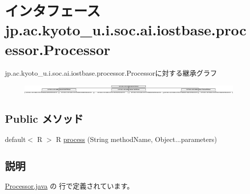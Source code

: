 \hypertarget{interfacejp_1_1ac_1_1kyoto__u_1_1i_1_1soc_1_1ai_1_1iostbase_1_1processor_1_1_processor}{\section{インタフェース jp.\-ac.\-kyoto\-\_\-u.\-i.\-soc.\-ai.\-iostbase.\-processor.\-Processor}
\label{interfacejp_1_1ac_1_1kyoto__u_1_1i_1_1soc_1_1ai_1_1iostbase_1_1processor_1_1_processor}
}
jp.\-ac.\-kyoto\-\_\-u.\-i.\-soc.\-ai.\-iostbase.\-processor.\-Processorに対する継承グラフ\begin{figure}[H]
\begin{center}
\leavevmode
\includegraphics[height=0.545809cm]{interfacejp_1_1ac_1_1kyoto__u_1_1i_1_1soc_1_1ai_1_1iostbase_1_1processor_1_1_processor}
\end{center}
\end{figure}
\subsection*{Public メソッド}
\begin{DoxyCompactItemize}
\item 
default$<$ R $>$ R \hyperlink{interfacejp_1_1ac_1_1kyoto__u_1_1i_1_1soc_1_1ai_1_1iostbase_1_1processor_1_1_processor_a66086dbe725d172267c517aa15f2122e}{process} (String method\-Name, Object...\-parameters)
\end{DoxyCompactItemize}


\subsection{説明}


 \hyperlink{_processor_8java_source}{Processor.\-java} の  行で定義されています。



